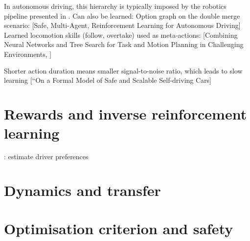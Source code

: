 In autonomous driving, this hierarchy is typically imposed by the robotics pipeline presented in . 
Can also be learned: Option graph on the double merge scenario: [Safe, Multi-Agent, Reinforcement Learning for Autonomous Driving]
Learned locomotion skills (follow, overtake) used as meta-actions: [Combining Neural Networks and Tree Search for Task and Motion Planning in Challenging Environments, ]

Shorter action duration means smaller signal-to-noise ratio, which leads to slow learning [“On a Formal Model of Safe and Scalable Self-driving Cars]

\section{Rewards and inverse reinforcement learning}


\citep{Sun2019}: estimate driver preferences

\section{Dynamics and transfer}
\section{Optimisation criterion and safety}
